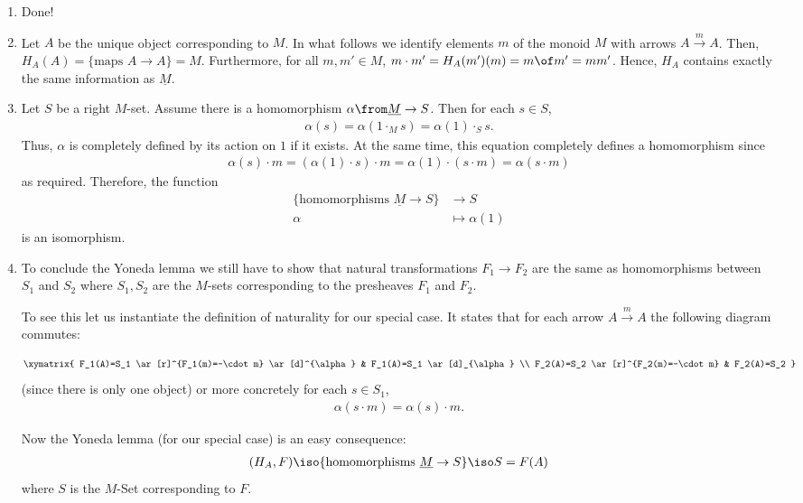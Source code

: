 \begin{answer}
  \begin{enumerate}
  \item Done!
  \item Let $A$ be the unique object corresponding to $M$. In what follows we identify elements $m$ of the monoid $M$ with arrows $A\xrightarrow{m}A$. Then, $H_A(A)=\{\text{maps } A\to A\}= M$. Furthermore, for all $m,m'\in M$, $m\cdot m'=H_A(m')(m)=m\of m'=mm'$. Hence, $H_A$ contains exactly the same information as $\underline M$.
  \item Let $S$ be a right $M$-set. Assume there is a homomorphism $\alpha\from \underline M\to S$. Then for each $s\in S$, 
    \begin{align*}
      \label{eq:defa}
      \alpha(s)=\alpha(1\cdot_M s)=\alpha(1)\cdot_S s.
    \end{align*}
    Thus, $\alpha$ is completely defined by its action on $1$ if it exists. At the same time, this equation completely defines a homomorphism since
    \begin{align*}
      \alpha(s)\cdot m=(\alpha(1)\cdot s)\cdot m=\alpha(1)\cdot(s\cdot m)=\alpha(s\cdot m)
    \end{align*}
    as required.
    Therefore, the function
    \begin{align*}
      \{\text{homomorphisms }\underline M\to S\}&\to S\\
      \alpha&\mapsto \alpha(1)
    \end{align*}
    is an isomorphism.
  \item To conclude the Yoneda lemma we still have to show that natural transformations $F_1\to F_2$ are the same as homomorphisms between $S_1$ and $S_2$ where $S_1,S_2$ are the $M$-sets corresponding to the presheaves $F_1$ and $F_2$. 

    To see this let us instantiate the definition of naturality for our special case. It states that for each arrow $A\xrightarrow{m}A$ the following diagram commutes:

    \begin{align*}
      \xymatrix{
      F_1(A)=S_1 \ar[r]^{F_1(m)=-\cdot m} \ar[d]^{\alpha} & F_1(A)=S_1 \ar[d]_{\alpha} \\
      F_2(A)=S_2 \ar[r]^{F_2(m)=-\cdot m} & F_2(A)=S_2
                   }
    \end{align*}
    (since there is only one object) or more concretely for each $s\in S_1$,
    \begin{align*}
      \alpha(s\cdot m)=\alpha(s)\cdot m.
    \end{align*}

    Now the Yoneda lemma (for our special case) is an easy consequence:
    \begin{align*}
      [M^\op,\Set](H_A, F)\iso \{\text{homomorphisms }\underline M\to S\}\iso S= F(A)
    \end{align*}
    where $S$ is the $M$-Set corresponding to $F$.
  \end{enumerate}
\end{answer}

